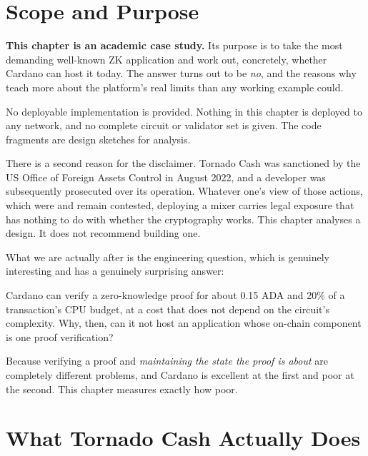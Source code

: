 
\section{Scope and Purpose} \label{sec:ch8-scope}

\begin{highlight}
\textbf{This chapter is an academic case study.} Its purpose is to take the most
demanding well-known ZK application and work out, concretely, whether Cardano
can host it today. The answer turns out to be \emph{no}, and the reasons why
teach more about the platform's real limits than any working example could.

No deployable implementation is provided. Nothing in this chapter is deployed to
any network, and no complete circuit or validator set is given. The code
fragments are design sketches for analysis.
\end{highlight}

There is a second reason for the disclaimer. Tornado Cash was sanctioned by the
US Office of Foreign Assets Control in August 2022, and a developer was
subsequently prosecuted over its operation. Whatever one's view of those
actions, which were and remain contested, deploying a mixer carries
legal exposure that has nothing to do with whether the cryptography works. This
chapter analyses a design. It does not recommend building one.

What we are actually after is the engineering question, which is genuinely
interesting and has a genuinely surprising answer:

\begin{outline}
Cardano can verify a zero-knowledge proof for about 0.15 ADA and 20\% of a
transaction's CPU budget, at a cost that does not depend on the circuit's
complexity. Why, then, can it not host an application whose on-chain component
is one proof verification?
\end{outline}

Because verifying a proof and \emph{maintaining the state the proof is about}
are completely different problems, and Cardano is excellent at the first and
poor at the second. This chapter measures exactly how poor.

\section{What Tornado Cash Actually Does} \label{sec:ch8-what}

